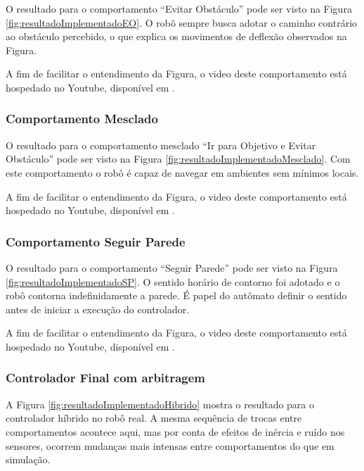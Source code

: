 	O resultado para o comportamento ``Evitar Obstáculo'' pode ser visto na Figura	
	\ref{fig:resultadoImplementadoEO}. O robô sempre busca adotar o caminho contrário
	ao obstáculo percebido, o que explica os movimentos de deflexão observados na Figura.
	
	
	
	A fim de facilitar o entendimento da Figura, o video deste comportamento está 
	hospedado no Youtube, disponível em .
	
	\subsubsection{Comportamento Mesclado}
	
	O resultado para o comportamento mesclado ``Ir para Objetivo e Evitar Obstáculo'' pode 
	ser visto na Figura \ref{fig:resultadoImplementadoMesclado}. Com este comportamento
	o robô é capaz de navegar em ambientes sem mínimos locais.   
	
	
	
	A fim de facilitar o entendimento da Figura, o video deste comportamento está 
	hospedado no Youtube, disponível em .
	
	\subsubsection{Comportamento Seguir Parede}
	
	O resultado para o comportamento ``Seguir Parede'' pode ser visto na Figura
	\ref{fig:resultadoImplementadoSP}. O sentido horário de contorno foi adotado
	e o robô contorna indefinidamente a parede. É papel do autômato definir o sentido 
	antes de iniciar a execução do controlador.
	
	
	
	A fim de facilitar o entendimento da Figura, o video deste comportamento está 
	hospedado no Youtube, disponível em .
	
	\subsubsection{Controlador Final com arbitragem}

	A Figura \ref{fig:resultadoImplementadoHibrido} mostra o resultado para o controlador híbrido no robô real.
	A mesma sequência de trocas entre comportamentos acontece aqui, mas por conta de efeitos de inércia e ruído
	nos sensores, ocorrem mudanças mais intensas entre comportamentos do que em simulação.
	

